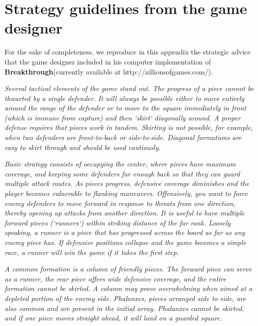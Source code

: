 \documentclass[a4paper,12pt]{article}
\newcommand{\BT}{\textbf{Breakthrough}\xspace}  %
\begin{document}

\newpage
\appendix



    \section{Strategy guidelines from the game designer}

    For the sake of completeness, we reproduce in this appendix the strategic advice that the game designer included in his computer implementation of \BT (currently available at http://zillionsofgames.com/).

    \vspace{2em}

    \emph{Several tactical elements of the game stand out.  The progress
        of a piece cannot be thwarted by a single defender.  It will always
        be possible either to move entirely around the range of the defender
        or to move to the square immediately in front (which is immune from
        capture) and then `skirt` diagonally around.  A proper defense requires
        that pieces work in tandem.  Skirting is not possible, for example, when
        two defenders are front-to-back or side-to-side.  Diagonal formations are
        easy to skirt through and should be used cautiously.}

    \emph{Basic strategy consists of occupying the center, where pieces have maximum
        coverage, and keeping some defenders far enough back so that they can guard
        multiple attack routes.  As pieces progress, defensive coverage diminishes
        and the player becomes vulnerable to flanking maneuvers.  Offensively, you
        want to force enemy defenders to move forward in response to threats from
        one direction, thereby opening up attacks from another direction.  It is
        useful to have multiple forward pieces (`runners`) within striking distance
        of the far rank.  Loosely speaking, a runner is a piece that has progressed
        across the board as far as any enemy piece has.  If defensive positions
        collapse and the game becomes a simple race, a runner will win the game if
        it takes the first step.}

    \emph{A common formation is a column of friendly pieces.  The forward piece can
        serve as a runner, the rear piece offers wide defensive coverage, and the
        entire formation cannot be skirted.  A column may prove overwhelming when
        aimed at a depleted portion of the enemy side.  Phalanxes, pieces arranged
        side to side, are also common and are present in the initial array.
        Phalanxes cannot be skirted, and if one piece moves straight ahead, it will
        land on a guarded square.}
\end{document}
